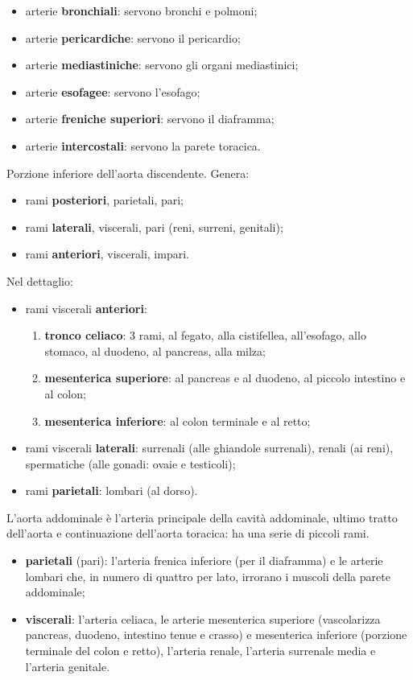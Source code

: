 \begin{itemize}
  \item arterie \textbf{bronchiali}: servono bronchi e polmoni;
  \item arterie \textbf{pericardiche}: servono il pericardio;
  \item arterie \textbf{mediastiniche}: servono gli organi mediastinici;
  \item arterie \textbf{esofagee}: servono l'esofago;
  \item arterie \textbf{freniche superiori}: servono il diaframma;
  \item arterie \textbf{intercostali}: servono la parete toracica.
\end{itemize}

Porzione inferiore dell'aorta discendente. Genera:
\begin{itemize}
  \item rami \textbf{posteriori}, parietali, pari;
  \item rami \textbf{laterali}, viscerali, pari (reni, surreni, genitali);
  \item rami \textbf{anteriori}, viscerali, impari.
\end{itemize}

Nel dettaglio:
\begin{itemize}
  \item rami viscerali \textbf{anteriori}:
  \begin{enumerate}
    \item \textbf{tronco celiaco}: 3 rami, al fegato, alla cistifellea, all'esofago, allo stomaco,
      al duodeno, al pancreas, alla milza;
    \item \textbf{mesenterica superiore}: al pancreas e al duodeno, al piccolo intestino e al
      colon;
    \item \textbf{mesenterica inferiore}: al colon terminale e al retto;
  \end{enumerate}
  \item rami viscerali \textbf{laterali}: surrenali (alle ghiandole surrenali), renali (ai reni),
    spermatiche (alle gonadi: ovaie e testicoli);
  \item rami \textbf{parietali}: lombari (al dorso).
\end{itemize}

L'aorta addominale è l'arteria principale della cavità addominale, ultimo tratto dell'aorta e
continuazione dell'aorta toracica: ha una serie di piccoli rami.
\begin{itemize}
  \item \textbf{parietali} (pari): l'arteria frenica inferiore (per il diaframma) e le arterie
    lombari che, in numero di quattro per lato, irrorano i muscoli della parete addominale;
  \item \textbf{viscerali}: l'arteria celiaca, le arterie mesenterica superiore (vascolarizza
    pancreas, duodeno, intestino tenue e crasso) e mesenterica inferiore (porzione terminale del
    colon e retto), l'arteria renale, l'arteria surrenale media e l'arteria genitale.
\end{itemize}

